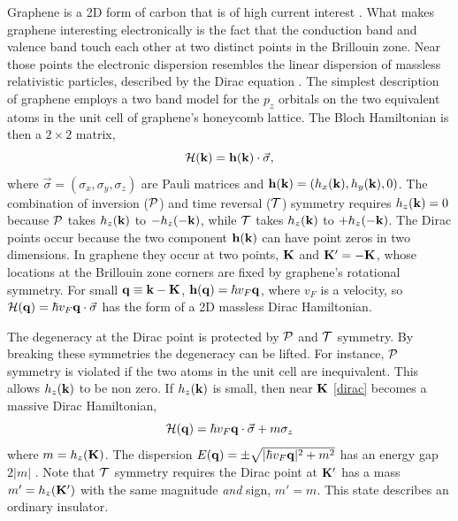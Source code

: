 \documentclass[twocolumn,floatfix,showpacs,rmp,aps]{revtex4}
\begin{document}
	Graphene is a 2D form of carbon that is of high current interest
	\cite{novoselov05, zhangy05, geim07,neto09}.  What makes graphene interesting
	electronically is the fact that the conduction band and valence
	band touch each other at two distinct points in the Brillouin zone.  Near
	those points the electronic dispersion resembles the linear dispersion
	of massless relativistic particles, described by the Dirac equation
	\cite{divencenzo84,semenoff84}.
	The simplest description of graphene employs a two band model for
	the $p_z$ orbitals on the two equivalent atoms in the unit
	cell of graphene's honeycomb lattice.  The Bloch Hamiltonian is
	then a $2\times 2$ matrix,
	\begin{equation}
		{\cal H}({\bf k}) = {\bf h}({\bf k}) \cdot \vec \sigma,
		\label{dirac}
	\end{equation}
	where $\vec\sigma = (\sigma_x,\sigma_y,\sigma_z)$ are Pauli matrices
	and ${\bf h}({\bf k}) = (h_x({\bf k}),h_y({\bf k}),0)$.  The
	combination of inversion ($\cal P$) and time reversal ($\cal T$) symmetry requires
	$h_z({\bf k})=0$ because
	$\cal P$ takes $h_z({\bf k})$ to $-h_z(-{\bf k})$, while $\cal T$ takes
	$h_z({\bf k})$ to $+h_z(-{\bf k})$.  The Dirac points
	occur because the two component ${\bf h}({\bf k})$ can have point
	zeros in two dimensions.  In graphene they occur at two points,
	${\bf K}$ and ${\bf K}'=-{\bf K}$, whose locations at the
	Brillouin zone corners are fixed
	by graphene's rotational symmetry.  For small ${\bf q} \equiv {\bf k}-{\bf K}$,
	${\bf h}({\bf q}) = \hbar v_F {\bf q}$, where $v_F$ is a velocity,
	so ${\cal H}({\bf q}) = \hbar v_F {\bf q}\cdot\vec\sigma$
	has the form of a 2D massless Dirac Hamiltonian.
	
	The degeneracy at the Dirac point is protected by $\cal P$ and $\cal T$ symmetry.
	By breaking these symmetries the degeneracy
	can be lifted.  For instance, $\cal P$ symmetry is violated if the
	two atoms in the unit cell are inequivalent.  This allows
	$h_z({\bf k})$ to be non zero.  If $h_z({\bf k})$ is small, then
	near ${\bf K}$ \eqref{dirac} becomes a massive Dirac
	Hamiltonian,
	\begin{equation}
		{\cal H}({\bf q}) = \hbar v_F{\bf q}\cdot\vec\sigma + m \sigma_z
		\label{diracmass}
	\end{equation}
	where $m = h_z({\bf K})$.  The dispersion
	$E({\bf q}) = \pm \sqrt{|\hbar v_F {\bf q}|^2+m^2}$ has an
	energy gap $2|m|$ .  Note
	that ${\cal T}$ symmetry requires the Dirac point at ${\bf K}'$ has
	a mass $m'=h_z({\bf K}')$ with the same magnitude {\it and} sign, $m' = m$.  This state
	describes an ordinary insulator.
	
\end{document}
